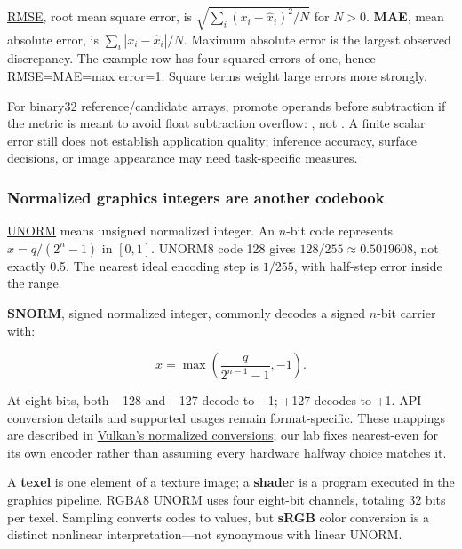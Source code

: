 \hyperref[appendix-537171d69d27]{RMSE}, root mean square error, is \(\sqrt{\sum_i(x_i-\widehat x_i)^2/N}\) for \(N>0\). \textbf{MAE}, mean absolute error, is \(\sum_i|x_i-\widehat x_i|/N\). Maximum absolute error is the largest observed discrepancy. The example row has four squared errors of one, hence RMSE=MAE=max error=1. Square terms weight large errors more strongly.

For binary32 reference/candidate arrays, promote operands before subtraction if the metric is meant to avoid float subtraction overflow: , not . A finite scalar error still does not establish application quality; inference accuracy, surface decisions, or image appearance may need task-specific measures.

\subsubsection{Normalized graphics integers are another codebook}\label{01-foundations-i-ch001-normalized-graphics-integers-are-another-codebook}

\hypertarget{01-foundations-i-ch001-normalized-graphics-integers-are-another-codebook}{}

\hyperref[appendix-b2402c453dac]{UNORM} means unsigned normalized integer. An \(n\)-bit code represents \(x=q/(2^n-1)\) in \([0,1]\). UNORM8 code 128 gives \(128/255\approx0.5019608\), not exactly 0.5. The nearest ideal encoding step is \(1/255\), with half-step error inside the range.

\textbf{SNORM}, signed normalized integer, commonly decodes a signed \(n\)-bit carrier with:

\[
x=\max\!\left(\frac{q}{2^{n-1}-1},-1\right).
\]

At eight bits, both −128 and −127 decode to −1; +127 decodes to +1. API conversion details and supported usages remain format-specific. These mappings are described in \href{https://docs.vulkan.org/spec/latest/chapters/fundamentals.html\#fundamentals-fixedfpconv}{Vulkan's normalized conversions}; our lab fixes nearest-even for its own encoder rather than assuming every hardware halfway choice matches it.

A \textbf{texel} is one element of a texture image; a \textbf{shader} is a program executed in the graphics pipeline. RGBA8 UNORM uses four eight-bit channels, totaling 32 bits per texel. Sampling converts codes to values, but \textbf{sRGB} color conversion is a distinct nonlinear interpretation---not synonymous with linear UNORM.

